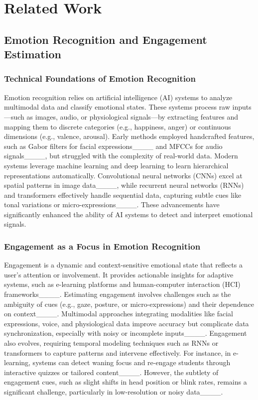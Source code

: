\section{Related Work}
\subsection{Emotion Recognition and Engagement Estimation}
\subsubsection{Technical Foundations of Emotion Recognition}
Emotion recognition relies on artificial intelligence (AI) systems to analyze multimodal data and classify emotional states. These systems process raw inputs—such as images, audio, or physiological signals—by extracting features and mapping them to discrete categories (e.g., happiness, anger) or continuous dimensions (e.g., valence, arousal). Early methods employed handcrafted features, such as Gabor filters for facial expressions____ and MFCCs for audio signals____, but struggled with the complexity of real-world data. 
Modern systems leverage machine learning and deep learning to learn hierarchical representations automatically. Convolutional neural networks (CNNs) excel at spatial patterns in image data____, while recurrent neural networks (RNNs) and transformers effectively handle sequential data, capturing subtle cues like tonal variations or micro-expressions____. These advancements have significantly enhanced the ability of AI systems to detect and interpret emotional signals.

\subsubsection{Engagement as a Focus in Emotion Recognition}
Engagement is a dynamic and context-sensitive emotional state that reflects a user’s attention or involvement. It provides actionable insights for adaptive systems, such as e-learning platforms and human-computer interaction (HCI) frameworks____. 
Estimating engagement involves challenges such as the ambiguity of cues (e.g., gaze, posture, or micro-expressions) and their dependence on context____. Multimodal approaches integrating modalities like facial expressions, voice, and physiological data improve accuracy but complicate data synchronization, especially with noisy or incomplete inputs____.
Engagement also evolves, requiring temporal modeling techniques such as RNNs or transformers to capture patterns and intervene effectively. For instance, in e-learning, systems can detect waning focus and re-engage students through interactive quizzes or tailored content____. However, the subtlety of engagement cues, such as slight shifts in head position or blink rates, remains a significant challenge, particularly in low-resolution or noisy data____.

